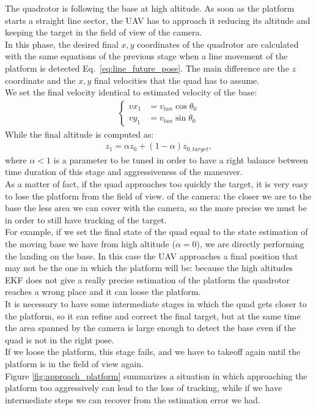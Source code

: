 The quadrotor is following the base at high altitude. As soon as the platform starts a straight line sector, the UAV has to approach it reducing its altitude and keeping the target in the field of view of the camera.\\
In this phase, the desired final $x,y$ coordinates of the quadrotor are calculated with the same equations of the previous stage when a line movement of the platform is detected Eq.~\eqref{eq:line_future_pose}. 
The main difference are the $z$ coordinate and the $x,y$ final velocities that the quad has to assume.\\
We set the final velocity identical to estimated velocity of the base:
\begin{align}
\begin{cases}
vx_1 &= v_{tan}\cos{\theta_0}\\[5pt]
vy_1 &= v_{tan}\sin{\theta_0}
\label{eq:finalstavelocity}
\end{cases}
\end{align}
While the final altitude is computed as:
\begin{align}
z_1 = \alpha z_0 + (1 - \alpha) z_{0,target},
\label{eq:finalz}
\end{align}
where $\alpha <  1$ is a parameter to be tuned in order to have a right balance between time duration of this stage and aggressiveness of the maneuver.\\
As a matter of fact, if the quad approaches too quickly the target, it is very easy to lose the platform from the field of view. of the camera: the closer we are to the base the less area we can cover with the camera, so the more precise we must be in order to still have tracking of the target.\\
For example, if we set the final state of the quad equal to the state estimation of the moving base we have from high altitude ($\alpha = 0$), we are directly performing the landing on the base. In this case the UAV approaches a final position that may not be the one in which the platform will be: because the high altitudes EKF does not give a really precise estimation of the platform the quadrotor reaches a wrong place and it can loose the platform. \\
It is necessary to have some intermediate stages in which the quad gets closer to the platform, so it can refine and correct the final target, but at the same time the area spanned by the camera is large enough to detect the base even if the quad is not in the right pose.\\
If we loose the platform, this stage fails, and we have to takeoff again until the platform is in the field of view again.\\
Figure  \ref{fig:approach_platform} summarizes a situation in which approaching the platform too aggressively can lead to the loss of tracking, while if we have intermediate steps we can recover from the estimation error we had.\\ 

